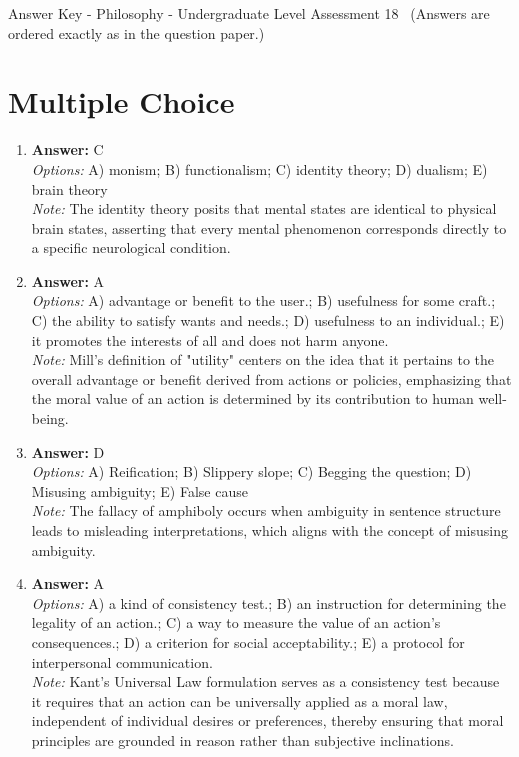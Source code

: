 \documentclass[12pt]{article}
\begin{document}
\begin{center}
Answer Key - Philosophy - Undergraduate Level Assessment 18 \
\small (Answers are ordered exactly as in the question paper.)
\end{center}

\section*{Multiple Choice}
\begin{enumerate}[label=\arabic*.]
\item \textbf{Answer:} C
\\ \textit{Options:} A) monism; B) functionalism; C) identity theory; D) dualism; E) brain theory
\\ \textit{Note:} The identity theory posits that mental states are identical to physical brain states, asserting that every mental phenomenon corresponds directly to a specific neurological condition.
\item \textbf{Answer:} A
\\ \textit{Options:} A) advantage or benefit to the user.; B) usefulness for some craft.; C) the ability to satisfy wants and needs.; D) usefulness to an individual.; E) it promotes the interests of all and does not harm anyone.
\\ \textit{Note:} Mill's definition of "utility" centers on the idea that it pertains to the overall advantage or benefit derived from actions or policies, emphasizing that the moral value of an action is determined by its contribution to human well-being.
\item \textbf{Answer:} D
\\ \textit{Options:} A) Reification; B) Slippery slope; C) Begging the question; D) Misusing ambiguity; E) False cause
\\ \textit{Note:} The fallacy of amphiboly occurs when ambiguity in sentence structure leads to misleading interpretations, which aligns with the concept of misusing ambiguity.
\item \textbf{Answer:} A
\\ \textit{Options:} A) a kind of consistency test.; B) an instruction for determining the legality of an action.; C) a way to measure the value of an action's consequences.; D) a criterion for social acceptability.; E) a protocol for interpersonal communication.
\\ \textit{Note:} Kant's Universal Law formulation serves as a consistency test because it requires that an action can be universally applied as a moral law, independent of individual desires or preferences, thereby ensuring that moral principles are grounded in reason rather than subjective inclinations.

\end{enumerate}
\end{document}

